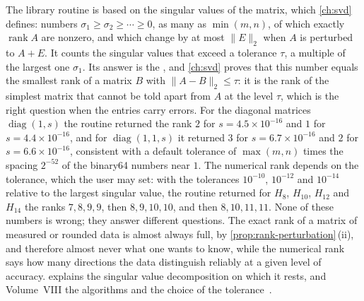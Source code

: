 The library routine is based on the singular values of the matrix, which \cref{ch:svd} defines: numbers $\sigma_1\ge\sigma_2\ge\cdots\ge0$, as many as $\min(m,n)$, of which exactly $\operatorname{rank}A$ are nonzero, and which change by at most $\|E\|_2$ when $A$ is perturbed to $A+E$. It counts the singular values that exceed a tolerance $\tau$, a multiple of the largest one $\sigma_1$. Its answer is the , and \cref{ch:svd} proves that this number equals the smallest rank of a matrix $B$ with $\|A-B\|_2\le\tau$: it is the rank of the simplest matrix that cannot be told apart from $A$ at the level $\tau$, which is the right question when the entries carry errors. For the diagonal matrices $\operatorname{diag}(1,s)$ the routine returned the rank $2$ for $s=4.5\times10^{-16}$ and $1$ for $s=4.4\times10^{-16}$, and for $\operatorname{diag}(1,1,s)$ it returned $3$ for $s=6.7\times10^{-16}$ and $2$ for $s=6.6\times10^{-16}$, consistent with a default tolerance of $\max(m,n)$ times the spacing $2^{-52}$ of the binary64 numbers near $1$. The numerical rank depends on the tolerance, which the user may set: with the tolerances $10^{-10}$, $10^{-12}$ and $10^{-14}$ relative to the largest singular value, the routine returned for $H_8$, $H_{10}$, $H_{12}$ and $H_{14}$ the ranks $7,8,9,9$, then $8,9,10,10$, and then $8,10,11,11$. None of these numbers is wrong; they answer different questions. The exact rank of a matrix of measured or rounded data is almost always full, by \cref{prop:rank-perturbation}\,(ii), and therefore almost never what one wants to know, while the numerical rank says how many directions the data distinguish reliably at a given level of accuracy.  explains the singular value decomposition on which it rests, and Volume~VIII the algorithms and the choice of the tolerance~\cite{golub2013}.

